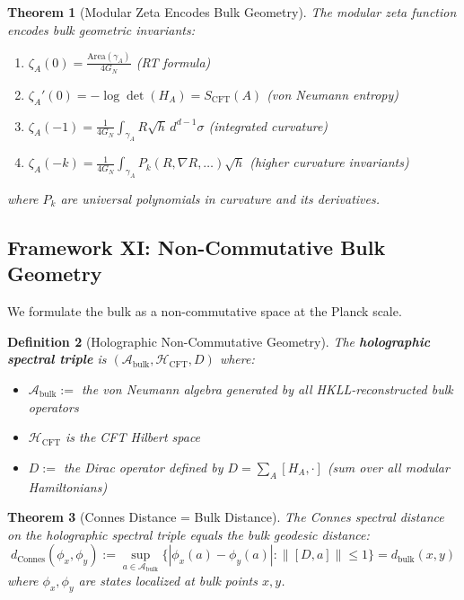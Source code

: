 \documentclass[12pt,a4paper]{article}
\newtheorem{theorem}{Theorem}[section]
\newtheorem{definition}[theorem]{Definition}
\begin{document}
\begin{theorem}[Modular Zeta Encodes Bulk Geometry]\label{thm:modular-zeta-geometry}
The modular zeta function encodes bulk geometric invariants:
\begin{enumerate}
    \item $\zeta_A(0) = \frac{\text{Area}(\gamma_A)}{4G_N}$ (RT formula)
    \item $\zeta_A'(0) = -\log \det(H_A) = S_{\text{CFT}}(A)$ (von Neumann entropy)
    \item $\zeta_A(-1) = \frac{1}{4G_N} \int_{\gamma_A} R \sqrt{h} \, d^{d-1}\sigma$ (integrated curvature)
    \item $\zeta_A(-k) = \frac{1}{4G_N} \int_{\gamma_A} P_k(R, \nabla R, \ldots) \sqrt{h}$ (higher curvature invariants)
\end{enumerate}
where $P_k$ are universal polynomials in curvature and its derivatives.
\end{theorem}

\subsection{Framework XI: Non-Commutative Bulk Geometry}

We formulate the bulk as a non-commutative space at the Planck scale.

\begin{definition}[Holographic Non-Commutative Geometry]\label{def:holo-ncg}
The \textbf{holographic spectral triple} is $(\mathcal{A}_{\text{bulk}}, \mathcal{H}_{\text{CFT}}, D)$ where:
\begin{itemize}
    \item $\mathcal{A}_{\text{bulk}} := $ the von Neumann algebra generated by all HKLL-reconstructed bulk operators
    \item $\mathcal{H}_{\text{CFT}}$ is the CFT Hilbert space
    \item $D := $ the Dirac operator defined by $D = \sum_A [H_A, \cdot]$ (sum over all modular Hamiltonians)
\end{itemize}
\end{definition}

\begin{theorem}[Connes Distance = Bulk Distance]\label{thm:connes-distance}
The Connes spectral distance on the holographic spectral triple equals the bulk geodesic distance:
\begin{equation}
d_{\text{Connes}}(\phi_x, \phi_y) := \sup_{a \in \mathcal{A}_{\text{bulk}}} \{ |\phi_x(a) - \phi_y(a)| : \|[D, a]\| \leq 1 \} = d_{\text{bulk}}(x, y)
\end{equation}
where $\phi_x, \phi_y$ are states localized at bulk points $x, y$.
\end{theorem}
\end{document}
